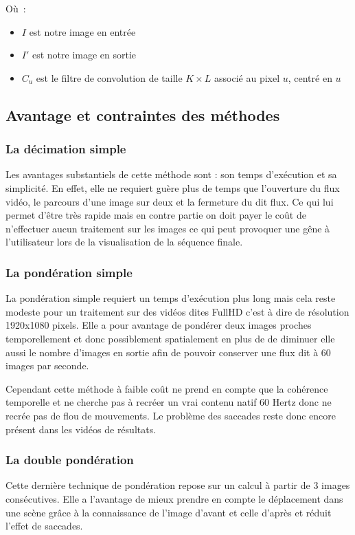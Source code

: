 \documentclass[fleqn,10pt]{SelfArx} %
\begin{document}
Où~:

\begin{itemize}
	\item $I$ est notre image en entrée 
	\item $I'$ est notre image en sortie 
	\item $C_{u}$ est le filtre de convolution de taille $K \times L$ associé au pixel $u$, centré en $u$
\end{itemize}

\subsection{Avantage et contraintes des méthodes}
\subsubsection{La décimation simple}
Les avantages substantiels de cette méthode sont : son temps d'exécution et sa simplicité. En effet, elle ne requiert guère plus de temps que l'ouverture du flux vidéo, le parcours d'une image sur deux et la fermeture du dit flux. Ce qui lui permet d'être très rapide mais en contre partie on doit payer le coût de n'effectuer aucun traitement sur les images ce qui peut provoquer une gêne à l'utilisateur lors de la visualisation de la séquence finale.

\subsubsection{La pondération simple}
La pondération simple requiert un temps d'exécution plus long mais cela reste modeste pour un traitement sur des vidéos dites \og FullHD \fg{} c'est à dire de résolution 1920x1080 pixels. Elle a pour avantage de pondérer deux images proches temporellement et donc possiblement spatialement en plus de de diminuer elle aussi le nombre d'images en sortie afin de pouvoir conserver une flux dit à 60 images par seconde.

Cependant cette méthode à faible coût ne prend en compte que la cohérence temporelle et ne cherche pas à recréer un vrai contenu natif 60 Hertz donc ne recrée pas de flou de mouvements. Le problème des saccades reste donc encore présent dans les vidéos de résultats.

\subsubsection{La double pondération}
Cette dernière technique de pondération repose sur un calcul à partir de 3 images consécutives. Elle a l'avantage de mieux prendre en compte le déplacement dans une scène grâce à la connaissance de l'image d'avant et celle d'après et réduit l'effet de saccades.
\end{document}

